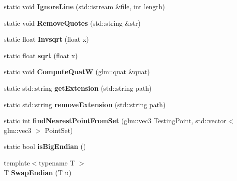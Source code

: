 \begin{DoxyCompactItemize}
\item 
static void {\bfseries Ignore\+Line} (std\+::istream \&file, int length)\hypertarget{namespace_helpers_a0c4250ef1929a210c417a21ad077ec92}{}\label{namespace_helpers_a0c4250ef1929a210c417a21ad077ec92}

\item 
static void {\bfseries Remove\+Quotes} (std\+::string \&str)\hypertarget{namespace_helpers_a17751634f225772e9133749707b9dcb2}{}\label{namespace_helpers_a17751634f225772e9133749707b9dcb2}

\item 
static float {\bfseries Invsqrt} (float x)\hypertarget{namespace_helpers_a412a8c28ae50d8ca3ef7f296333c7a9d}{}\label{namespace_helpers_a412a8c28ae50d8ca3ef7f296333c7a9d}

\item 
static float {\bfseries sqrt} (float x)\hypertarget{namespace_helpers_a6fa11caf01daa47ce1296f3ac4ba7e3c}{}\label{namespace_helpers_a6fa11caf01daa47ce1296f3ac4ba7e3c}

\item 
static void {\bfseries Compute\+QuatW} (glm\+::quat \&quat)\hypertarget{namespace_helpers_a2fdcaeee48c2e96fd8cf8dca8b7e2cd9}{}\label{namespace_helpers_a2fdcaeee48c2e96fd8cf8dca8b7e2cd9}

\item 
static std\+::string {\bfseries get\+Extension} (std\+::string path)\hypertarget{namespace_helpers_a1b4d31a8da380c85ca8863aebf865abb}{}\label{namespace_helpers_a1b4d31a8da380c85ca8863aebf865abb}

\item 
static std\+::string {\bfseries remove\+Extension} (std\+::string path)\hypertarget{namespace_helpers_a1c2c6599fa2aa2c8d6232f7a3f7a8f6a}{}\label{namespace_helpers_a1c2c6599fa2aa2c8d6232f7a3f7a8f6a}

\item 
static int {\bfseries find\+Nearest\+Point\+From\+Set} (glm\+::vec3 Testing\+Point, std\+::vector$<$ glm\+::vec3 $>$ Point\+Set)\hypertarget{namespace_helpers_a24e5fdb5e80e510e2d0801d27cee7b24}{}\label{namespace_helpers_a24e5fdb5e80e510e2d0801d27cee7b24}

\item 
static bool {\bfseries is\+Big\+Endian} ()\hypertarget{namespace_helpers_ab515b737c1e6c2945283f2bb1d6d7f87}{}\label{namespace_helpers_ab515b737c1e6c2945283f2bb1d6d7f87}

\item 
{\footnotesize template$<$typename T $>$ }\\T {\bfseries Swap\+Endian} (T u)\hypertarget{namespace_helpers_a26a713db95eff93b8df1b879897c3aa9}{}\label{namespace_helpers_a26a713db95eff93b8df1b879897c3aa9}


\end{DoxyCompactItemize}
